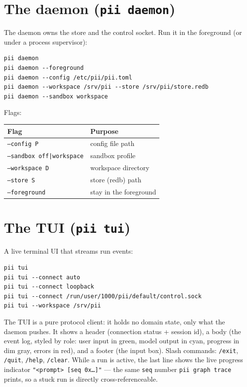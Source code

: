 \documentclass[
	fontsize=10pt,
	twoside=false,
	secnumdepth=2,
	open=any,
]{kaobook}
\begin{document}
\section{The daemon (\texttt{pii daemon})}

The daemon owns the store and the control socket. Run it in the
foreground (or under a process supervisor):

\begin{cmdbox}[Daemon]
\begin{lstlisting}
pii daemon
pii daemon --foreground
pii daemon --config /etc/pii/pii.toml
pii daemon --workspace /srv/pii --store /srv/pii/store.redb
pii daemon --sandbox workspace
\end{lstlisting}
\end{cmdbox}

Flags:

\begin{longtable}{@{}ll@{}}
\toprule
\textbf{Flag} & \textbf{Purpose} \\
\midrule
\endhead
\texttt{--config P} & config file path \\
\texttt{--sandbox off|workspace} & sandbox profile \\
\texttt{--workspace D} & workspace directory \\
\texttt{--store S} & store (redb) path \\
\texttt{--foreground} & stay in the foreground \\
\bottomrule
\end{longtable}

\section{The TUI (\texttt{pii tui})}

A live terminal UI that streams run events:

\begin{cmdbox}[TUI]
\begin{lstlisting}
pii tui
pii tui --connect auto
pii tui --connect loopback
pii tui --connect /run/user/1000/pii/default/control.sock
pii tui --workspace /srv/pii
\end{lstlisting}
\end{cmdbox}

The TUI is a pure protocol client: it holds no domain state, only what the
daemon pushes. It shows a header (connection status + session id), a body
(the event log, styled by role: user input in green, model output in
cyan, progress in dim gray, errors in red), and a footer (the input box).
Slash commands: \texttt{/exit}, \texttt{/quit}, \texttt{/help},
\texttt{/clear}. While a run is active, the last line shows the live
progress indicator \texttt{"<prompt> [seq 0x\ldots]"} — the same
\texttt{seq} number \texttt{pii graph trace} prints, so a stuck run is
directly cross-referenceable.
\end{document}
